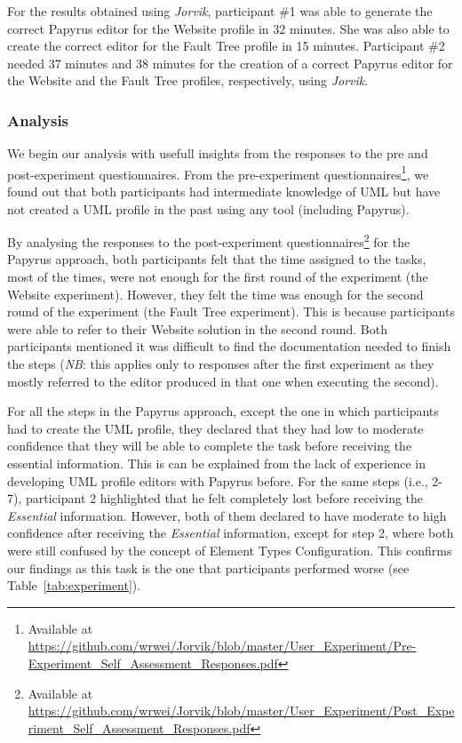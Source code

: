 For the results obtained using \textit{Jorvik}, participant \#1 was able to generate the correct Papyrus editor for the Website profile in 32 minutes. She was also able to create the correct editor for the Fault Tree profile in 15 minutes.
Participant \#2 needed 37 minutes and 38 minutes for the creation of a correct Papyrus editor for the Website and the Fault Tree profiles, respectively, using \textit{Jorvik}.


\subsubsection{Analysis} 
We begin our analysis with usefull insights from the responses to the pre and post-experiment questionnaires.
From the pre-experiment questionnaires\footnote{Available at \url{https://github.com/wrwei/Jorvik/blob/master/User_Experiment/Pre-Experiment_Self_Assessment_Responses.pdf}}, we found out that both participants had intermediate knowledge of UML but have not created a UML profile in the past using any tool (including Papyrus).

By analysing the responses to the post-experiment questionnaires\footnote{Available at \url{https://github.com/wrwei/Jorvik/blob/master/User_Experiment/Post_Experiment_Self_Assessment_Responses.pdf}} for the Papyrus approach,
both participants felt that the time assigned to the tasks, most of the times, were not enough for the first round of the experiment (the Website experiment). However, they felt the time was enough for the second round of the experiment (the Fault Tree experiment). This is because participants were able to refer to their Website solution in the second round. Both participants mentioned it was difficult to find the documentation needed to finish the steps (\textit{NB}: this applies only to responses after the first experiment as they mostly referred to the editor produced in that one when executing the second).

For all the steps in the Papyrus approach, except the one in which participants had to create the UML profile, they declared that they had low to moderate confidence that they will be able to complete the task before receiving the essential information. This is can be explained from the lack of experience in developing UML profile editors with Papyrus before. For the same steps (i.e., 2-7), participant 2 highlighted 
that he felt completely lost before receiving the \textit{Essential} information. However, both of them declared to have moderate to high confidence after receiving the \textit{Essential} information, except for step 2, where both were still confused by the concept of Element Types Configuration. This confirms our findings as this task is the one that participants performed worse (see Table~\ref{tab:experiment}). 
	
